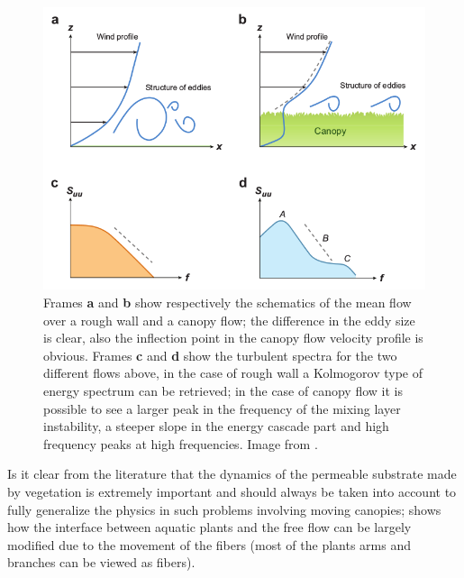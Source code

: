 \begin{figure}[h]
	\centering
	\includegraphics[width=0.7\linewidth]{chapter_1/spectra}
	\caption{Frames \textbf{a} and \textbf{b} show respectively the schematics of the mean flow over a rough wall and a canopy flow; the difference in the eddy size is clear, also the inflection point in the canopy flow velocity profile is obvious.
		Frames \textbf{c} and \textbf{d} show the turbulent spectra for the two different flows above, in the case of rough wall a Kolmogorov type of energy spectrum can be retrieved; in the case of canopy flow it is possible to see  a larger peak in the frequency of the mixing layer instability, a steeper slope in the energy cascade part and high frequency peaks at high frequencies. Image from \citet{de2008effects}.}
		\label{fig:spectra}
	\end{figure}

Is it clear from the literature that the dynamics of the permeable substrate made by vegetation is extremely important and should always be taken into account to fully generalize the physics in such problems involving moving canopies; \citet{nepf2012flow} shows how the interface between aquatic plants and the free flow can be largely modified due to the movement of the fibers (most of the plants arms and branches can be viewed as fibers).

